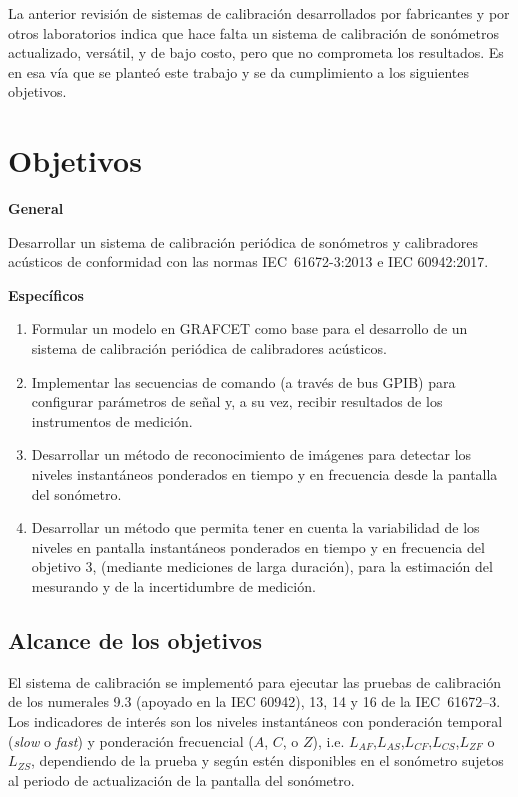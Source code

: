 La anterior revisión de sistemas de calibración desarrollados por fabricantes y por otros laboratorios indica que hace
falta un sistema de calibración de sonómetros actualizado, versátil, y de bajo costo, pero que no comprometa los
resultados.
Es en esa vía que se planteó este trabajo y se da cumplimiento a los siguientes objetivos.


\section{Objetivos}

\textbf{General}

Desarrollar un sistema de calibración periódica de sonómetros y calibradores acústicos de conformidad con las normas
\mbox{IEC 61672-3:2013} e {IEC 60942:2017}.
\vfill
\pagebreak

\textbf{Específicos}

\begin{enumerate}
    \item Formular un modelo en GRAFCET como base para el desarrollo de un sistema de calibración periódica de
    calibradores acústicos.
    \item Implementar las secuencias de comando (a través de bus GPIB) para configurar parámetros de señal y, a su vez,
    recibir resultados de los instrumentos de medición.
    \item Desarrollar un método de reconocimiento de imágenes para detectar los niveles instantáneos ponderados en
    tiempo y en frecuencia desde la pantalla del sonómetro.
    \item Desarrollar un método que permita tener en cuenta la variabilidad de los niveles en pantalla instantáneos
    ponderados en tiempo y en frecuencia del objetivo 3, (mediante mediciones de larga duración), para la estimación
    del mesurando y de la incertidumbre de medición.
\end{enumerate}

\subsection{Alcance de los objetivos}
El sistema de calibración se implementó para ejecutar las pruebas de calibración de los numerales 9.3 (apoyado en la
IEC 60942), 13, 14 y 16 de la \mbox{IEC 61672--3}.
Los indicadores de interés son los niveles instantáneos con ponderación temporal (\emph{slow} o \emph{fast}) y
ponderación frecuencial ($A$, $C$, o $Z$), i.e. $L_{AF}$,$L_{AS}$,$L_{CF}$,$L_{CS}$,$L_{ZF}$ o $L_{ZS}$, dependiendo
de la prueba y según estén disponibles en el sonómetro sujetos al periodo de actualización de la pantalla del sonómetro.


